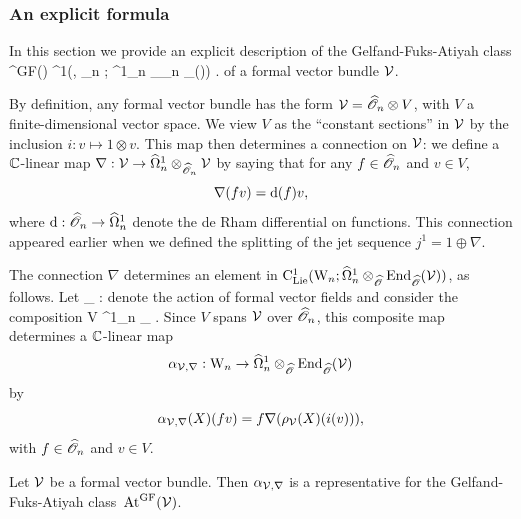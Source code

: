 \subsubsection{An explicit formula}

In this section we provide an explicit description of the Gelfand-Fuks-Atiyah class  
\ben
\At^{\rm GF}(\cV) \in \clie^1(\Vect, \GL_n ; \hOmega^1_n
\tensor_{\hO_n} \End_{\hO}(\cV)) .
\een 
of a formal vector bundle $\mathcal{V}$. 

By definition, any formal vector bundle has the form $\mathcal{V} = \widehat{\mathscr O}_n \otimes V$, 
with $V$ a finite-dimensional vector space.
We view $V$ as the ``constant sections'' in $\mathcal{V}$ by the inclusion $i: v \mapsto 1 \otimes v$.
This map then determines a connection on $\mathcal{V}$:
we define a $\mathbb C$-linear map $\nabla: \mathcal{V} \to \widehat{\Omega}^1_n \otimes_{\widehat{\mathscr O}_n} \mathcal{V}$
by saying that for any $f \in \widehat{\mathscr O}_n$ and $v \in V$,
\[
\nabla(f v) = {\rm d} (f) v,
\]
where ${\rm d} : \widehat{\mathscr O}_n \to \widehat{\Omega}^1_n$ denote the de Rham
differential on functions. This connection appeared earlier when we
defined the splitting of the jet sequence $j^1 = 1 \oplus \nabla$. 

The connection $\nabla$ determines an element in ${\rm C}_{{\rm Lie}}^1({{\rm W}_n} ;
\widehat{\Omega}^1_n \otimes_{\widehat{\mathscr O}} {\rm End}_{\widehat{\mathscr O}}(\mathcal{V}))$, as follows. Let 
\ben
\rho_{\cV} : \Vect \tensor \cV \to \cV
\een
denote the action of formal vector fields and consider the composition
\ben
\Vect \tensor V  \Vect \tensor \cV \xto{\rho_{\cV}} \cV \xto{\nabla} \hOmega^1_n \tensor_{\hO} \cV .
\een 
Since $V$ spans $\mathcal{V}$ over $\widehat{\mathscr O}_n$, this composite map determines a $\mathbb C$-linear map
\[
\alpha_{\mathcal{V},\nabla}: {{\rm W}_n} \to \widehat{\Omega}^1_n \otimes_{\widehat{\mathscr O}} {\rm End}_{\widehat{\mathscr O}}(\mathcal{V})
\]
by
\[
\alpha_{\mathcal{V},\nabla}(X)(fv) = f \nabla( \rho_{\mathcal{V}}(X)(i(v))),
\]
with $f \in \widehat{\mathscr O}_n$ and $v \in V$.

\begin{prop} \label{atiyahprop1} 
Let $\mathcal{V}$ be a formal vector bundle. 
Then $\alpha_{\mathcal{V},\nabla}$ is a representative for the Gelfand-Fuks-Atiyah class~${\rm At}^{\rm GF}(\mathcal{V})$. 
\end{prop}

